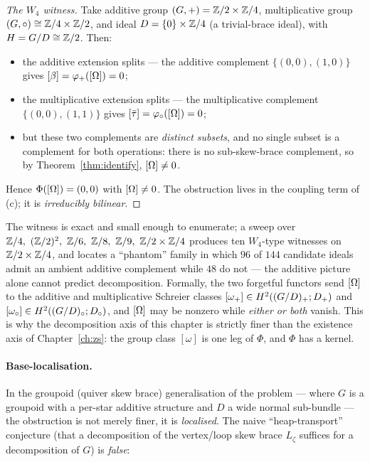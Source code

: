 \begin{proof}[The $W_4$ witness]
Take additive group $(G,+)=\mathbb{Z}/2\times\mathbb{Z}/4$, multiplicative group
$(G,\circ)\cong\mathbb{Z}/4\times\mathbb{Z}/2$, and ideal $D=\{0\}\times\mathbb{Z}/4$ (a trivial-brace
ideal), with $H=G/D\cong\mathbb{Z}/2$. Then:
\begin{itemize}
\item the additive extension splits --- the additive complement
   $\{(0,0),(1,0)\}$ gives $[\beta]=\varphi_+([\Omega])=0$;
\item the multiplicative extension splits --- the multiplicative complement
   $\{(0,0),(1,1)\}$ gives $[\bar\tau]=\varphi_\circ([\Omega])=0$;
\item but these two complements are \emph{distinct subsets}, and no single subset
   is a complement for both operations: there is no sub-skew-brace complement, so
   by Theorem~\ref{thm:identify}, $[\Omega]\neq0$.
\end{itemize}
Hence $\Phi([\Omega])=(0,0)$ with $[\Omega]\neq0$. The obstruction lives in the coupling
term of (c); it is \emph{irreducibly bilinear}.
\end{proof}

The witness is exact and small enough to enumerate; a sweep over
$\Z/4,\ (\Z/2)^2,\ \Z/6,\ \Z/8,\ \Z/9,\ \Z/2\times\Z/4$ produces ten $W_4$-type
witnesses on $\mathbb{Z}/2\times\mathbb{Z}/4$, and locates a ``phantom'' family in which
$96$ of $144$ candidate ideals admit an ambient additive complement while $48$ do
not --- the additive picture alone cannot predict decomposition. Formally, the two
forgetful functors send $[\Omega]$ to the additive and multiplicative Schreier classes
$[\omega_+]\in H^2((G/D)_+;D_+)$ and $[\omega_\circ]\in H^2((G/D)_\circ;D_\circ)$,
and $[\Omega]$ may be nonzero while \emph{either or both} vanish. This is why the
decomposition axis of this chapter is strictly finer than the existence axis of
Chapter~\ref{ch:zs}: the group class $[\omega]$ is one leg of $\Phi$, and $\Phi$
has a kernel.

\paragraph{Base-localisation.}
In the groupoid (quiver skew brace) generalisation of the problem --- where $G$ is
a groupoid with a per-star additive structure and $D$ a wide normal sub-bundle ---
the obstruction is not merely finer, it is \emph{localised}. The naive
``heap-transport'' conjecture (that a decomposition of the vertex/loop skew brace
$L_\zeta$ suffices for a decomposition of $G$) is \emph{false}:


